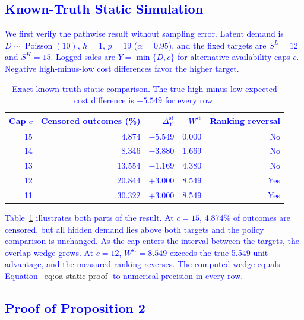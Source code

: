 \documentclass[msom,dblanonrev]{informs4}
\newcommand{\add}[1]{\textcolor{blue}{#1}}
\begin{document}
\subsection{\add{Known-Truth Static Simulation}}

\add{We first verify the pathwise result without sampling error. Latent demand is $D\sim\operatorname{Poisson}(10)$, $h=1$, $p=19$ ($\alpha=0.95$), and the fixed targets are $S^L=12$ and $S^H=15$. Logged sales are $Y=\min\{D,c\}$ for alternative availability caps $c$. Negative high-minus-low cost differences favor the higher target.}

\begin{table}[htbp]
\centering
\caption{\add{Exact known-truth static comparison. The true high-minus-low expected cost difference is $-5.549$ for every row.}}
\label{tab:oa-known-truth-static}
\small
\begin{tabular}{rrrrr}
\toprule
\add{Cap $c$} & \add{Censored outcomes (\%)} & \add{$\Delta_Y^{\mathrm{st}}$} & \add{$W^{\mathrm{st}}$} & \add{Ranking reversal} \\
\midrule
\add{15} & \add{4.874}  & \add{$-5.549$} & \add{0.000} & \add{No} \\
\add{14} & \add{8.346}  & \add{$-3.880$} & \add{1.669} & \add{No} \\
\add{13} & \add{13.554} & \add{$-1.169$} & \add{4.380} & \add{No} \\
\add{12} & \add{20.844} & \add{$+3.000$} & \add{8.549} & \add{Yes} \\
\add{11} & \add{30.322} & \add{$+3.000$} & \add{8.549} & \add{Yes} \\
\bottomrule
\end{tabular}
\end{table}

\add{Table~\ref{tab:oa-known-truth-static} illustrates both parts of the result. At $c=15$, 4.874\% of outcomes are censored, but all hidden demand lies above both targets and the policy comparison is unchanged. As the cap enters the interval between the targets, the overlap wedge grows. At $c=12$, $W^{\mathrm{st}}=8.549$ exceeds the true 5.549-unit advantage, and the measured ranking reverses. The computed wedge equals Equation~\eqref{eq:oa-static-proof} to numerical precision in every row.}

\subsection{\add{Proof of Proposition 2}}
\end{document}
